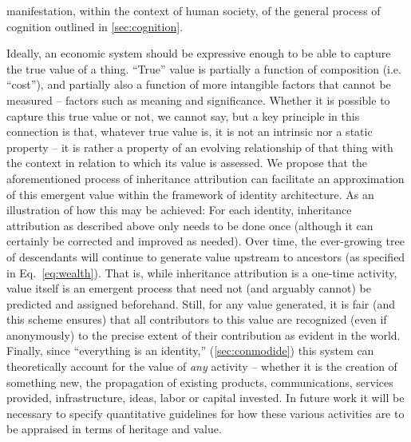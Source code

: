 \documentclass[pra,twocolumn,groupedaddress,10pt]{revtex4}
\theoremstyle{definition}
\begin{document}
manifestation, within the context of human society, of the general process of cognition outlined in \autoref{sec:cognition}.

Ideally, an economic system should be expressive enough to be able to capture the true value of a thing. ``True'' value is partially a function of composition (i.e. ``cost''), and partially also a function of more intangible factors that cannot be measured -- factors such as meaning and significance. Whether it is possible to capture this true value or not, we cannot say, but a key principle in this connection is that, whatever true value is, it is not an intrinsic nor a static property -- it is rather a property of an evolving relationship of that thing with the context in relation to which its value is assessed. We propose that the aforementioned process of inheritance attribution can facilitate an approximation of this emergent value within the framework of identity architecture. As an illustration of how this may be achieved: For each identity, inheritance attribution as described above only needs to be done once (although it can certainly be corrected and improved as needed). Over time, the ever-growing tree of descendants will continue to generate value upstream to ancestors (as specified in Eq.~\ref{eq:wealth}). That is, while inheritance attribution is a one-time activity, value itself is an emergent process that need not (and arguably cannot) be predicted and assigned beforehand. Still, for any value generated, it is fair (and this scheme ensures) that all contributors to this value are recognized (even if anonymously) to the precise extent of their contribution as evident in the world. Finally, since ``everything is an identity,'' (\autoref{sec:conmodide}) this system can theoretically account for the value of \textit{any} activity -- whether it is the creation of something new, the propagation of existing products, communications, services provided, infrastructure, ideas, labor or capital invested. In future work it will be necessary to specify quantitative guidelines for how these various activities are to be appraised in terms of heritage and value.
\end{document}
